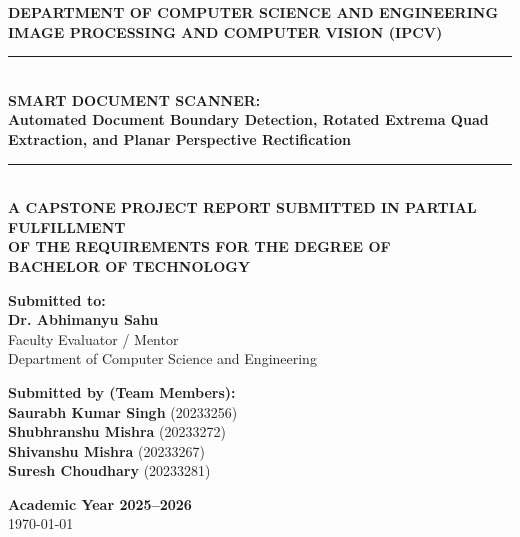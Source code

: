 \documentclass[11pt,a4paper]{article}
\begin{document}
\begin{titlepage}
    \centering
    \vspace*{1.0cm}

    {\Large \textbf{\textcolor{darkslate}{DEPARTMENT OF COMPUTER SCIENCE AND ENGINEERING}}}\\[0.4em]
    {\large \textbf{IMAGE PROCESSING AND COMPUTER VISION (IPCV)}}\\[2.0cm]

    \rule{\linewidth}{1.5pt}\\[1.0em]
    {\LARGE \textbf{\textcolor{primaryblue}{SMART DOCUMENT SCANNER:}}}\\[0.5em]
    {\Large \textbf{Automated Document Boundary Detection, Rotated Extrema Quad Extraction, and Planar Perspective Rectification}}\\[0.8em]
    \rule{\linewidth}{1.5pt}\\[2.5cm]

    \textbf{A CAPSTONE PROJECT REPORT SUBMITTED IN PARTIAL FULFILLMENT}\\[0.3em]
    \textbf{OF THE REQUIREMENTS FOR THE DEGREE OF}\\[0.3em]
    \textbf{BACHELOR OF TECHNOLOGY}\\[3.0cm]

    \begin{minipage}[t]{0.48\textwidth}
        \flushleft
        \textbf{\large Submitted to:}\\[0.4em]
        {\Large \textbf{Dr. Abhimanyu Sahu}}\\[0.2em]
        Faculty Evaluator / Mentor\\
        Department of Computer Science and Engineering
    \end{minipage}
    \hfill
    \begin{minipage}[t]{0.48\textwidth}
        \flushright
        \textbf{\large Submitted by (Team Members):}\\[0.4em]
        \textbf{Saurabh Kumar Singh} \quad (20233256)\\[0.25em]
        \textbf{Shubhranshu Mishra} \quad (20233272)\\[0.25em]
        \textbf{Shivanshu Mishra} \quad (20233267)\\[0.25em]
        \textbf{Suresh Choudhary} \quad (20233281)
    \end{minipage}

    \vfill
    {\large \textbf{Academic Year 2025--2026}}\\[0.3em]
    \today
\end{titlepage}
\end{document}
